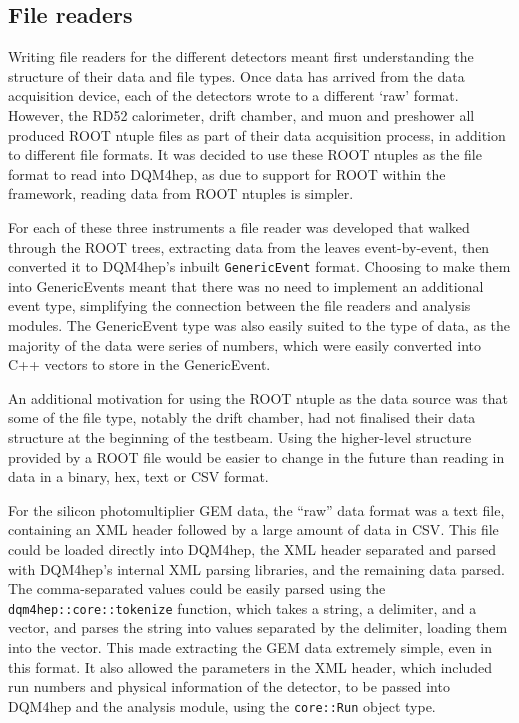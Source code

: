 \subsection{File readers}
Writing file readers for the different detectors meant first understanding the structure of their data and file types. Once data has arrived from the data acquisition device, each of the detectors wrote to a different `raw' format. However, the RD52 calorimeter, drift chamber, and muon and preshower all produced ROOT ntuple files as part of their data acquisition process, in addition to different file formats. It was decided to use these ROOT ntuples as the file format to read into \acrshort{DQM4hep}, as due to support for ROOT within the framework, reading data from ROOT ntuples is simpler.

For each of these three instruments a file reader was developed that walked through the ROOT trees, extracting data from the leaves event-by-event, then converted it to \acrshort{DQM4hep}'s inbuilt \texttt{GenericEvent} format. Choosing to make them into GenericEvents meant that there was no need to implement an additional event type, simplifying the connection between the file readers and analysis modules. The GenericEvent type was also easily suited to the type of data, as the majority of the data were series of numbers, which were easily converted into C++ vectors to store in the GenericEvent.

An additional motivation for using the ROOT ntuple as the data source was that some of the file type, notably the drift chamber, had not finalised their data structure at the beginning of the testbeam. Using the higher-level structure provided by a ROOT file would be easier to change in the future than reading in data in a binary, hex, text or \acrshort{CSV} format.

For the silicon photomultiplier \acrshort{GEM} data, the ``raw'' data format was a text file, containing an \acrshort{XML} header followed by a large amount of data in \acrfull{CSV}. This file could be loaded directly into \acrshort{DQM4hep}, the \acrshort{XML} header separated and parsed with \acrshort{DQM4hep}'s internal \acrshort{XML} parsing libraries, and the remaining data parsed. The comma-separated values could be easily parsed using the \texttt{dqm4hep::core::tokenize} function, which takes a string, a delimiter, and a vector, and parses the string into values separated by the delimiter, loading them into the vector. This made extracting the \acrshort{GEM} data extremely simple, even in this format. It also allowed the parameters in the \acrshort{XML} header, which included run numbers and physical information of the detector, to be passed into DQM4hep and the analysis module, using the \texttt{core::Run} object type.

